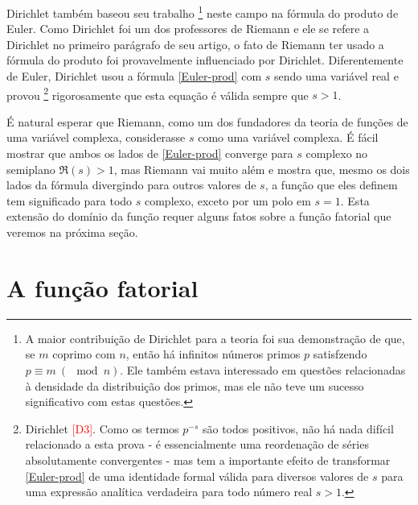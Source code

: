     Dirichlet também baseou seu trabalho
    \footnote{A maior contribuição de Dirichlet para a teoria foi sua demonstração de que, se $m$ coprimo com $n$, então há infinitos números primos $p$ satisfzendo $p \equiv m \ (\mod n)$. Ele também estava interessado em questões relacionadas à densidade da distribuição dos primos, mas ele não teve um sucesso significativo com estas questões. 
    }
    neste campo na fórmula do produto de Euler. Como Dirichlet foi um dos professores de Riemann e ele se refere a Dirichlet no primeiro parágrafo de seu artigo, o fato de Riemann ter usado a fórmula do produto foi provavelmente influenciado por Dirichlet. Diferentemente de Euler, Dirichlet usou a fórmula \eqref{Euler-prod} com $s$ sendo uma variável real e provou
    \footnote{Dirichlet \textcolor{red}{[D3]}. Como os termos $p^{-s}$ são todos positivos, não há nada difícil relacionado a esta prova - é essencialmente uma reordenação de séries absolutamente convergentes - mas tem a importante efeito de transformar \eqref{Euler-prod} de uma identidade formal válida  para diversos valores de $s$ para uma expressão analítica verdadeira para todo número real $s>1$.
    }
    rigorosamente que esta equação é válida sempre que $s>1$.
    
    É natural esperar que Riemann, como um dos fundadores da teoria de funções de uma variável complexa, considerasse $s$ como uma variável complexa. É fácil mostrar que ambos os lados de \eqref{Euler-prod} converge para $s$ complexo no semiplano $\Re(s)>1$, mas Riemann vai muito além e mostra que, mesmo os dois lados da fórmula divergindo para outros valores de $s$, a função que eles definem tem significado para todo $s$ complexo, exceto por um polo em $s=1$. Esta extensão do domínio da função requer alguns fatos sobre a função fatorial que veremos na próxima seção.
    
    
    \section{A função fatorial}
    
